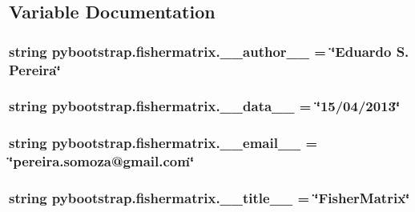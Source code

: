 \subsection{Variable Documentation}
\hypertarget{namespacepybootstrap_1_1fishermatrix_a644402150560da2b17c276223f391c68}{
\subsubsection[{\-\_\-\-\_\-author\-\_\-\-\_\-}]{\setlength{\rightskip}{0pt plus 5cm}string pybootstrap.\-fishermatrix.\-\_\-\-\_\-author\-\_\-\-\_\- = \char`\"{}Eduardo S. Pereira\char`\"{}}}\label{namespacepybootstrap_1_1fishermatrix_a644402150560da2b17c276223f391c68}
\hypertarget{namespacepybootstrap_1_1fishermatrix_ab9d599538bc14e05d183f7889c61c65c}{
\subsubsection[{\-\_\-\-\_\-data\-\_\-\-\_\-}]{\setlength{\rightskip}{0pt plus 5cm}string pybootstrap.\-fishermatrix.\-\_\-\-\_\-data\-\_\-\-\_\- = \char`\"{}15/04/2013\char`\"{}}}\label{namespacepybootstrap_1_1fishermatrix_ab9d599538bc14e05d183f7889c61c65c}
\hypertarget{namespacepybootstrap_1_1fishermatrix_ae9470b31d0dda4732c30ee307b18dd55}{
\subsubsection[{\-\_\-\-\_\-email\-\_\-\-\_\-}]{\setlength{\rightskip}{0pt plus 5cm}string pybootstrap.\-fishermatrix.\-\_\-\-\_\-email\-\_\-\-\_\- = \char`\"{}pereira.\-somoza@gmail.\-com\char`\"{}}}\label{namespacepybootstrap_1_1fishermatrix_ae9470b31d0dda4732c30ee307b18dd55}
\hypertarget{namespacepybootstrap_1_1fishermatrix_a6be5abab1eee0d5fcb07ea0c359954e4}{
\subsubsection[{\-\_\-\-\_\-title\-\_\-\-\_\-}]{\setlength{\rightskip}{0pt plus 5cm}string pybootstrap.\-fishermatrix.\-\_\-\-\_\-title\-\_\-\-\_\- = \char`\"{}Fisher\-Matrix\char`\"{}}}\label{namespacepybootstrap_1_1fishermatrix_a6be5abab1eee0d5fcb07ea0c359954e4}

